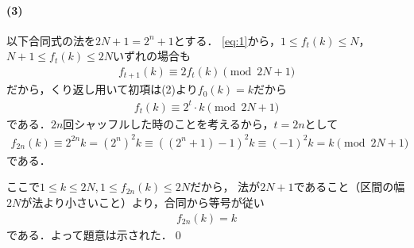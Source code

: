 \documentclass[../../main.tex]{subfiles}
\begin{document}
\paragraph{(3)}

以下合同式の法を$2N+1=2^n+1$とする．
\cref{eq:1}から，$1\le f_t(k)\le N$，$N+1\le f_t(k)\le2N$いずれの場合も
\begin{align}
  f_{t+1}(k) \equiv 2f_t(k) \pmod{2N+1} \label{eq:2}
\end{align}
だから，くり返し用いて初項は(2)より$f_0(k)=k$だから
\begin{align}
  f_t(k) \equiv 2^t \cdot k \pmod{2N+1}
\end{align}
である．$2n$回シャッフルした時のことを考えるから，$t=2n$として
\begin{align}
  f_{2n}(k) \equiv 2^{2n}k = \left(2^n\right)^2k \equiv \left((2^n+1)-1\right)^2k \equiv (-1)^2k=k\pmod{2N+1}
\end{align}
である．

ここで$1\le k\le 2N, 1\le f_{2n}(k)\le 2N$だから，
法が$2N+1$であること（区間の幅$2N$が法より小さいこと）より，合同から等号が従い
\begin{align}
  f_{2n}(k)=k
\end{align}
である．よって題意は示された．\qed
\end{document}
